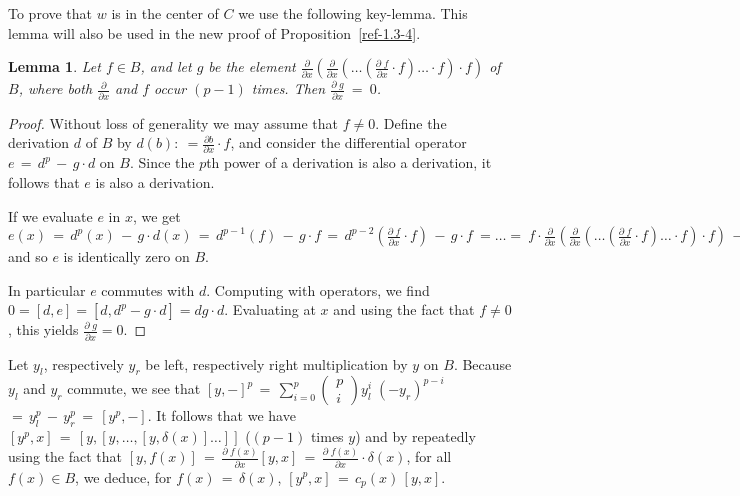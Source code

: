 \documentclass{amsart}
\numberwithin{equation}{section}
\newtheorem{lemma}{Lemma}[section]
\theoremstyle{definition}
\theoremstyle{remark}
\begin{document}
To prove that $w$ is in the center of $C$ we use the following
 key-lemma. This lemma  will also be  used
 in the new proof of Proposition~\ref{ref-1.3-4}.

\begin{lemma} \label{ref-3.1-7}
    Let $f \in B$,
    and let $g$ be the element $\displaystyle{ \frac{\partial}{\partial
    x} \left( \frac{ \partial}{ \partial x} \left( \ldots \left(
    \frac{\partial \; f}{\partial  x} \cdot f \right) \ldots \cdot f
    \right) \cdot f \right)}$ of $B$, where both
    $\displaystyle{\frac{\partial}{\partial x}}$ and $f$ occur $(p-1)$
    times.
     Then $\displaystyle{ \frac{\partial \;g}{\partial x} \:=\:0}$.
\end{lemma}

\begin{proof} Without loss of generality we may assume that $f\neq
    0$. Define the derivation $d$ of $B$ by
    $\displaystyle{d(b) :~= \frac{ \partial b}{\partial x} \cdot f}$,
    and
    consider the differential operator $e\,=\,d^{p}\,-\,g \cdot d$ on $B$. Since
    the $p$th power of a derivation is also a derivation, it follows
    that $e$ is also a derivation.

 If we evaluate $e$ in $x$, we get
    $e(x)\,=\,d^{p}(x) \,-\,g \cdot d(x) \,=\,
    d^{p-1}(f) \,-\, g \cdot f \,=\, \displaystyle{d^{p-2} \left( \frac{\partial \;
    f}{\partial x} \cdot f \right) \,-\, g \cdot f \: = \ldots =\: f
    \cdot \frac{\partial}{\partial x} \left( \frac{ \partial}{ \partial x}
    \left( \ldots \left( \frac{\partial \; f}{\partial x} \cdot f \right)
    \ldots \cdot f \right) \cdot f \right) \,-\, g \cdot f} \,=\, 
    f \cdot g \,-\, g \cdot f \,=\, 0$ and so $e$ is identically zero
    on $B$.
  
In particular $e$ commutes with $d$. Computing with operators, we find
$0=[d,e]=[d,d^p-g\cdot d]=dg\cdot d$. Evaluating at $x$ and using the
fact that $f\neq 0$, this yields $\displaystyle{\frac{\partial \; g}{\partial
  x}=0}$.
\end{proof}

Let $y_{l}$, respectively $y_{r}$ be left, respectively right
multiplication by $y$ on $B$. Because $y_{l}$ and $y_{r}$ commute, we
see that $\displaystyle{[y,-]^{p} \,=\, \sum_{i=0}^{p} \left(
\begin{array}{c}p\\i \end{array} \right) y_{l}^{i}\;(-y_{r})^{p-i}}$ 
$=\, y_{l}^{p} \,-\, y_{r}^{p} \,=\,[y^{p},-]$.
It follows that we have $[y^{p},x] \,=\, [y,[y, \ldots ,[y ,\delta(x)]
\ldots ]]$ ($(p-1)$ times $y$) and by repeatedly using the fact that
$\displaystyle{[y,f(x)]\,=\, \frac{\partial \; f(x)}{\partial x}[y,x]
\,=\, \frac{\partial \; f(x)}{\partial x} \cdot \delta(x)}$, for all
$f(x) \in B$, we deduce, for $f(x) \,=\, \delta(x)$, $[y^{p},x] \,=\,
c_{p}(x)\,[y,x]$.
\end{document}
